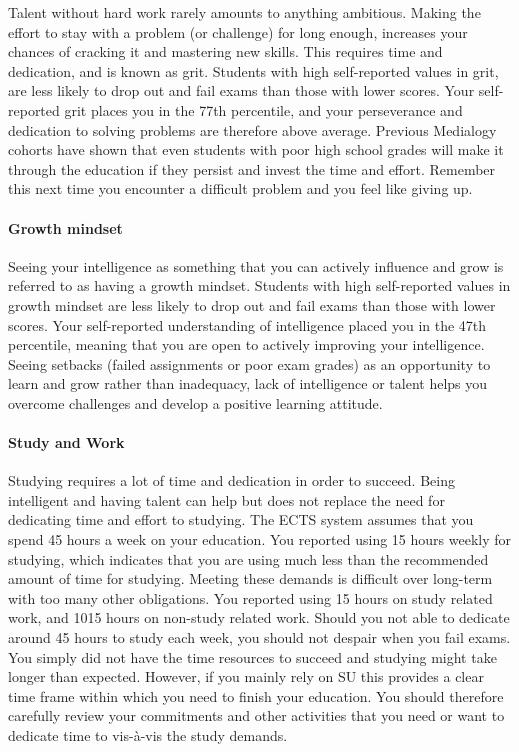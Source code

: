 \documentclass[]{article}
\let\oldparagraph\paragraph
\renewcommand{\paragraph}[1]{\oldparagraph{#1}\mbox{}}
\begin{document}
Talent without hard work rarely amounts to anything ambitious. Making
the effort to stay with a problem (or challenge) for long enough,
increases your chances of cracking it and mastering new skills. This
requires time and dedication, and is known as grit. Students with high
self-reported values in grit, are less likely to drop out and fail exams
than those with lower scores. Your self-reported grit places you in the
77th percentile, and your perseverance and dedication to solving
problems are therefore above average. Previous Medialogy cohorts have
shown that even students with poor high school grades will make it
through the education if they persist and invest the time and effort.
Remember this next time you encounter a difficult problem and you feel
like giving up.

\paragraph{Growth mindset}\label{growth-mindset}

Seeing your intelligence as something that you can actively influence
and grow is referred to as having a growth mindset. Students with high
self-reported values in growth mindset are less likely to drop out and
fail exams than those with lower scores. Your self-reported
understanding of intelligence placed you in the 47th percentile, meaning
that you are open to actively improving your intelligence. Seeing
setbacks (failed assignments or poor exam grades) as an opportunity to
learn and grow rather than inadequacy, lack of intelligence or talent
helps you overcome challenges and develop a positive learning attitude.

\paragraph{Study and Work}\label{study-and-work}

Studying requires a lot of time and dedication in order to succeed.
Being intelligent and having talent can help but does not replace the
need for dedicating time and effort to studying. The ECTS system assumes
that you spend 45 hours a week on your education. You reported using 15
hours weekly for studying, which indicates that you are using much less
than the recommended amount of time for studying. Meeting these demands
is difficult over long-term with too many other obligations. You
reported using 15 hours on study related work, and 1015 hours on
non-study related work. Should you not able to dedicate around 45 hours
to study each week, you should not despair when you fail exams. You
simply did not have the time resources to succeed and studying might
take longer than expected. However, if you mainly rely on SU this
provides a clear time frame within which you need to finish your
education. You should therefore carefully review your commitments and
other activities that you need or want to dedicate time to vis-à-vis the
study demands.
\end{document}
